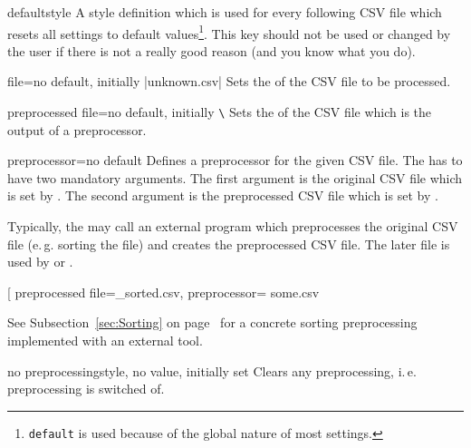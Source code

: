 \documentclass[a4paper,11pt]{ltxdoc}
\begin{document}
\begin{docCsvKey}{default}{}{style}
  A style definition which is used for every following CSV file which
  resets all settings to default values\footnote{\texttt{default} is used
  because of the global nature of most settings.}.
  This key should not be used or changed by the user if there is not a
  really good reason (and you know what you do).
\end{docCsvKey}


\begin{docCsvKey}{file}{=}{no default, initially |unknown.csv|}
  Sets the  of the CSV file to be processed.
\end{docCsvKey}


\begin{docCsvKey}{preprocessed file}{=}{no default, initially \texttt{\textbackslash{}}}
  Sets the  of the CSV file which is the output of a
  preprocessor.
\end{docCsvKey}


\begin{docCsvKey}{preprocessor}{=}{no default}
  Defines a preprocessor for the given CSV file.
  The  has to have two mandatory arguments. The first argument
  is the original CSV file which is set by .
  The second argument is the preprocessed CSV file
  which is set by .\par\smallskip
  Typically, the  may call an external program which preprocesses
  the original CSV file (e.\,g. sorting the file) and creates the
  preprocessed CSV file. The later file is used by 
  or .
\begin{dispListing}
\newcommand{\mySortTool}[2]{%
}

\csvreader[%
  preprocessed file=\jobname_sorted.csv,
  preprocessor=\mySortTool,
  ]{some.csv}{}{%
}
\end{dispListing}
See Subsection~\ref{sec:Sorting} on page~\pageref{sec:Sorting} for a
concrete sorting preprocessing implemented with an external tool.
\end{docCsvKey}


\begin{docCsvKey}{no preprocessing}{}{style, no value, initially set}
  Clears any preprocessing, i.\,e. preprocessing is switched of.
\end{docCsvKey}
\end{document}
